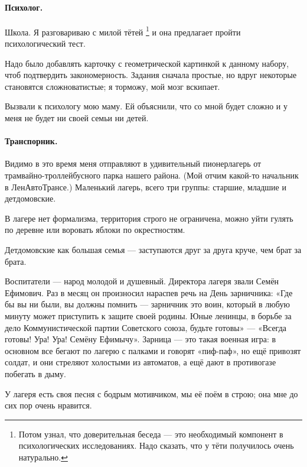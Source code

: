 \documentclass{book}
\begin{document}
\paragraph{Психолог.}
Школа.
Я разговариваю с милой тётей%
\footnote{Потом узнал, что доверительная беседа --- это необходимый компонент в психологических исследованиях.
Надо сказать, что у тёти получилось очень натурально.}
и она предлагает пройти психологический тест.

Надо было добавлять карточку с геометрической картинкой к данному набору, чтоб подтвердить закономерность.
Задания сначала простые, но вдруг некоторые становятся сложноватистые;
я торможу, мой мозг вскипает.

Вызвали к психологу мою маму.
Ей объяснили, что со мной будет сложно и у меня не будет ни своей семьи ни детей.

\paragraph{Транспорник.}
Видимо в это время меня отправляют в удивительный пионерлагерь от трамвайно-троллейбусного парка нашего района.
(Мой отчим какой-то начальник в ЛенАвтоТрансе.)
Маленький лагерь, всего три группы: старшие, младшие и детдомовские.

В лагере нет формализма, территория строго не ограничена, можно уйти гулять по деревне или воровать яблоки по окрестностям.

Детдомовские как большая семья --- заступаются друг за друга круче, чем брат за брата.

Воспитатели --- народ молодой и душевный.
Директора лагеря звали Семён Ефимович.
Раз в месяц он произносил нараспев речь на День зарничника:
«Где бы вы ни были, вы должны помнить --- зарничник это воин, который в любую минуту может приступить к защите своей родины.
Юные ленинцы, в борьбе за дело Коммунистической партии Советского союза, будьте готовы» --- «Всегда готовы! Ура! Ура! Семёну Ефимычу».
Зарница --- это такая военная игра: в основном все бегают по лагерю с палками и говорят «пиф-паф»,
но  ещё привозят солдат, и они стреляют холостыми из автоматов, а
ещё дают в противогазе побегать в дыму.

У лагеря есть своя песня с бодрым мотивчиком, мы её поём в строю;
она мне до сих пор очень нравится.
\end{document}
